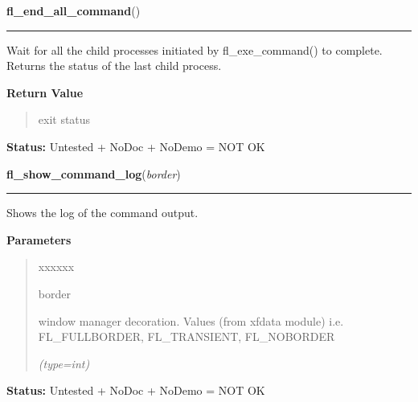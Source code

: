 \hspace{.8\funcindent}\begin{boxedminipage}{\funcwidth}

    \raggedright \textbf{fl\_end\_all\_command}()

    \vspace{-1.5ex}

    \rule{\textwidth}{0.5\fboxrule}
\setlength{\parskip}{2ex}
    Wait for all the child processes initiated by fl\_exe\_command() to 
    complete. Returns the status of the last child process.

\setlength{\parskip}{1ex}
      \textbf{Return Value}
    \vspace{-1ex}

      \begin{quote}
      exit status

      \end{quote}

\textbf{Status:} Untested + NoDoc + NoDemo = NOT OK



    \end{boxedminipage}

    \label{xformslib:flgoodies:fl_show_command_log}

    \vspace{0.5ex}

\hspace{.8\funcindent}\begin{boxedminipage}{\funcwidth}

    \raggedright \textbf{fl\_show\_command\_log}(\textit{border})

    \vspace{-1.5ex}

    \rule{\textwidth}{0.5\fboxrule}
\setlength{\parskip}{2ex}
    Shows the log of the command output.

\setlength{\parskip}{1ex}
      \textbf{Parameters}
      \vspace{-1ex}

      \begin{quote}
        \begin{Ventry}{xxxxxx}

          \item[border]

          window manager decoration. Values (from xfdata module) i.e. 
          FL\_FULLBORDER, FL\_TRANSIENT, FL\_NOBORDER

            {\it (type=int)}

        \end{Ventry}

      \end{quote}

\textbf{Status:} Untested + NoDoc + NoDemo = NOT OK



    \end{boxedminipage}

